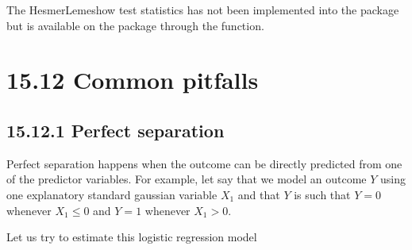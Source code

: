 \documentclass[letterpaper,10pt,english]{jupyterBook}
\begin{document}
\sphinxAtStartPar
The Hesmer\sphinxhyphen{}Lemeshow test statistics has not been implemented into the  package but is available on the  package through the  function.


\section{15.12 Common pitfalls}
\label{\detokenize{15.k. Logistic Regression:common-pitfalls}}\label{\detokenize{15.k. Logistic Regression::doc}}

\subsection{15.12.1 Perfect separation}
\label{\detokenize{15.k. Logistic Regression:perfect-separation}}
\sphinxAtStartPar
Perfect separation happens when the outcome can be directly predicted from one of the predictor variables. For example, let say that we model an outcome \(Y\) using one explanatory standard gaussian variable \(X_1\) and that \(Y\) is such that \(Y=0\) whenever \(X_1\leq0\) and \(Y=1\) whenever \(X_1>0\).

\begin{sphinxVerbatim}[commandchars=\\\{\}]
    
    

  
\end{sphinxVerbatim}

\sphinxAtStartPar
Let us try to estimate this logistic regression model

\begin{sphinxVerbatim}[commandchars=\\\{\}]
          
\end{sphinxVerbatim}
\end{document}
